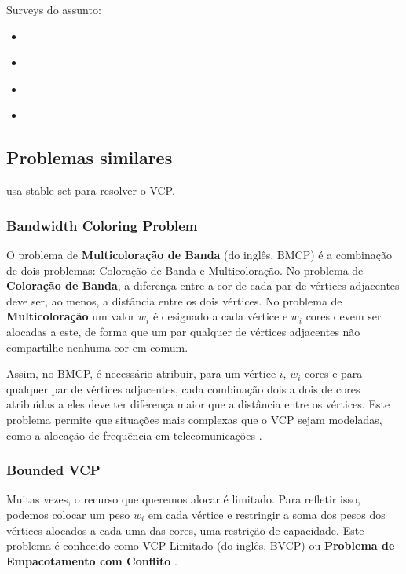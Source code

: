 \documentclass[11pt]{article}
\begin{document}
Surveys do assunto:
\begin{itemize}
\item \autocite{Malaguti2010SurveyVertexColoring}
\item \autocite{Lewis2015GuideGraphColouring}
\item \autocite{Husfeldt2015Graphcolouringalgorithms}
\item \autocite{Lima2018ExactAlgorithmsGraph}
\end{itemize}

\subsection{Problemas similares}
\label{sec:orgbd6f4fa}
\textcites{Cornaz2008oneonecorrespondence}[][]{Cornaz2017SolvingVertexColoring} usa stable set para resolver o VCP.
\subsubsection{Bandwidth Coloring Problem}
\label{sec:orga18a3f8}
O problema de \textbf{Multicoloração de Banda} (do inglês, BMCP) é a combinação de dois problemas: Coloração de Banda e Multicoloração.
No problema de \textbf{Coloração de Banda}, a diferença entre a cor de cada par de vértices adjacentes deve ser, ao menos, a distância entre os dois vértices.
No problema de \textbf{Multicoloração} um valor \(w_i\) é designado a cada vértice e \(w_i\) cores devem ser alocadas a este, de forma que um par qualquer de vértices adjacentes não compartilhe nenhuma cor em comum.

Assim, no BMCP, é necessário atribuir, para um vértice \(i\), \(w_i\) cores e para qualquer par de vértices adjacentes, cada combinação dois a dois de cores atribuídas a eles deve ter diferença maior que a distância entre os vértices.
Este problema permite que situações mais complexas que o VCP sejam modeladas, como a alocação de frequência em telecomunicações \autocite{Aardal2007Modelssolutiontechniques}.

\subsubsection{Bounded VCP}
\label{sec:org2e3b7ad}
Muitas vezes, o recurso que queremos alocar é limitado.
Para refletir isso, podemos colocar um peso \(w_i\)  em cada vértice e restringir a soma dos pesos dos vértices alocados a cada uma das cores, uma restrição de capacidade.
Este problema é conhecido como VCP Limitado (do inglês, BVCP) ou \textbf{Problema de Empacotamento com Conflito} \autocite{Connolly1991KnapsackProblemsAlgorithms}.
\end{document}
